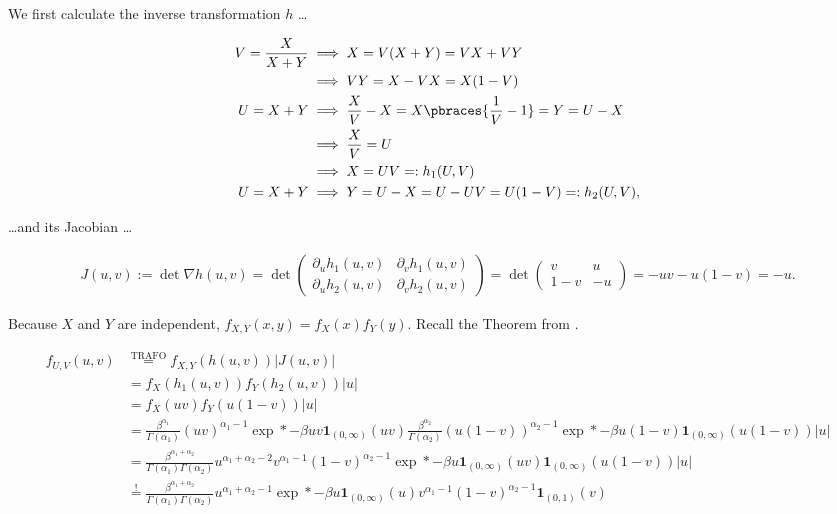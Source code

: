 \begin{solution}

We first calculate the inverse transformation $h$ \dots

\begin{align*}
    V = \frac{X}{X + Y}
    & \implies
    X = V (X + Y) = V X + V Y \\
    & \implies
    V Y = X - V X = X (1 - V ) \\
    U = X + Y
    & \implies
    \frac{X}{V} - X = X \pbraces{\frac{1}{V} - 1} = Y = U - X \\
    & \implies
    \frac{X}{V} = U \\
    & \implies
    X = U V =: h_1(U, V) \\
    U = X + Y
    & \implies
    Y = U - X = U - U V = U (1 - V) =: h_2(U, V),
\end{align*}

\dots and its Jacobian \dots

\begin{align*}
    J(u, v)
    :=
    \det \nabla h(u, v)
    =
    \det
    \begin{pmatrix}
        \partial_u h_1(u, v) & \partial_v h_1(u, v) \\
        \partial_u h_2(u, v) & \partial_v h_2(u, v)
    \end{pmatrix}
    =
    \det
    \begin{pmatrix}
            v &  u \\
        1 - v & -u
    \end{pmatrix}
    =
    -u v - u (1 - v)
    =
    -u.
\end{align*}

Because $X$ and $Y$ are independent, $f_{X, Y}(x, y) = f_X(x) f_Y(y)$.
Recall the Theorem from \cite[Lecture 3, Slide 32]{EStat}.

\begin{align*}
    f_{U, V}(u, v)
    & \stackrel
    {
        \text{TRAFO}
    }{=}
    f_{X, Y}(h(u, v)) |J(u, v)| \\
    & =
    f_X(h_1(u, v)) f_Y(h_2(u, v)) |u| \\
    & =
    f_X(u v) f_Y(u (1 - v)) |u| \\
    & =
    \frac{\beta^{\alpha_1}}{\Gamma(\alpha_1)} (u v)      ^{\alpha_1 - 1} \exp*{-\beta u v}       \mathbf 1_{(0, \infty)}(u v)
    \frac{\beta^{\alpha_2}}{\Gamma(\alpha_2)} (u (1 - v))^{\alpha_2 - 1} \exp*{-\beta u (1 - v)} \mathbf 1_{(0, \infty)}(u (1 - v))
    |u| \\
    & =
    \frac{\beta^{\alpha_1 + \alpha_2}}{\Gamma(\alpha_1) \Gamma(\alpha_2)}
    u^{\alpha_1 + \alpha_2 - 2}
    v^{\alpha_1 - 1} (1 - v)^{\alpha_2 - 1}
    \exp*{-\beta u}
    \mathbf 1_{(0, \infty)}(u v)
    \mathbf 1_{(0, \infty)}(u (1 - v))
    |u| \\
    & \stackrel{!}{=}
    \frac{\beta^{\alpha_1 + \alpha_2}}{\Gamma(\alpha_1) \Gamma(\alpha_2)}
    u^{\alpha_1 + \alpha_2 - 1}
    \exp*{-\beta u}
    \mathbf 1_{(0, \infty)}(u)
    v^{\alpha_1 - 1} (1 - v)^{\alpha_2 - 1}
    \mathbf 1_{(0, 1)}(v)
\end{align*}


\end{solution}

